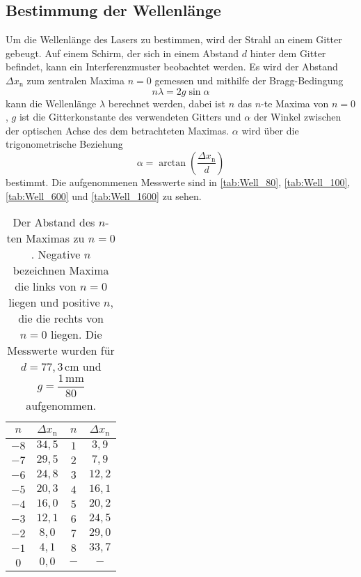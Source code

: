\subsection{Bestimmung der Wellenlänge}
\label{sec:Wellenlänge}

Um die Wellenlänge des Lasers zu bestimmen, wird der Strahl an einem Gitter gebeugt. Auf einem Schirm, der sich in einem Abstand $d$ hinter dem Gitter befindet, kann ein Interferenzmuster beobachtet werden. Es wird der Abstand $\Delta x_\text{n}$ zum zentralen Maxima $n = 0$ gemessen und mithilfe der Bragg-Bedingung
\begin{equation}
    n \lambda = 2 g \sin{\alpha}
    \label{eq:bragg}
\end{equation}
kann die Wellenlänge $\lambda$ berechnet werden, dabei ist $n$ das $n$-te Maxima von $n=0$, $g$ ist die Gitterkonstante des verwendeten Gitters und $\alpha$ der Winkel zwischen der optischen Achse des dem betrachteten Maximas.
$\alpha$ wird über die trigonometrische Beziehung  
\begin{equation*}
    \alpha = \arctan(\frac{\Delta x_\text{n}}{d})
    \label{eq:trig}
\end{equation*} 
bestimmt. Die aufgenommenen Messwerte sind in \autoref{tab:Well_80}, \autoref{tab:Well_100}, \autoref{tab:Well_600} und \autoref{tab:Well_1600} zu sehen.

\begin{table}[H]
    \centering
    \caption{Der Abstand des $n$-ten Maximas zu $n = 0$. Negative $n$ bezeichnen Maxima die links von $n = 0$ liegen und positive $n$, die die rechts von $n = 0$ liegen. Die Messwerte wurden für $d = 77,3 \, \unit{\centi\meter}$ und $g = \dfrac{1 \, \unit{\milli\meter}}{80}$ aufgenommen.}
    \label{tab:Well_80}
    \begin{tabular}{c c c c}
    \toprule
     $n$ & $\Delta x_\text{n}$ &   $n$ & $\Delta x_\text{n}$\\
    \midrule
        $-8$  &$ 34,5$ &        $1$ &  $ 3,9$ \\
        $-7$  &$ 29,5$ &        $2$ &  $ 7,9$ \\
        $-6$  &$ 24,8$ &        $3$ &  $12,2$ \\
        $-5$  &$ 20,3$ &        $4$ &  $16,1$ \\
        $-4$  &$ 16,0$ &        $5$ &  $20,2$ \\
        $-3$  &$ 12,1$ &        $6$ &  $24,5$ \\
        $-2$  &$ 8,0 $ &        $7$ &  $29,0$ \\
        $-1$  &$ 4,1 $ &        $8$ &  $33,7$ \\
       $ 0 $  &$ 0,0 $ &        $-$ &  $   -$ \\
    \bottomrule
    \end{tabular}
    \end{table}

